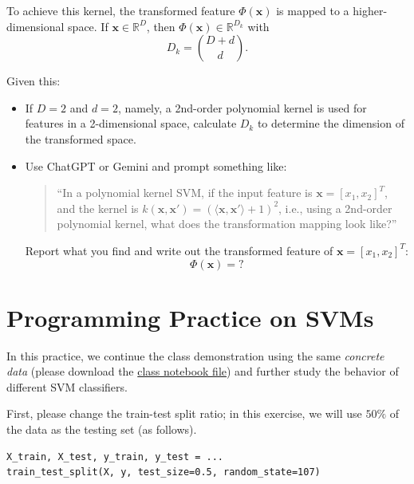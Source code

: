 \documentclass[12pt]{article}
\begin{document}
To achieve this kernel, the transformed feature $\Phi(\bm{x})$ is mapped to a higher-dimensional space. If $\bm{x} \in \mathbb{R}^D$, then $\Phi(\bm{x}) \in \mathbb{R}^{D_k}$ with 
\[
D_k = \binom{D+d}{d}.
\]

Given this:
\begin{itemize}
    \item If $D = 2$ and $d = 2$, namely, a 2nd-order polynomial kernel is used for features in a 2-dimensional space, calculate $D_k$ to determine the dimension of the transformed space.
    
    \item Use ChatGPT or Gemini and prompt something like: 
    \begin{quote}
    ``In a polynomial kernel SVM, if the input feature is $\bm{x} = [x_1, x_2]^T$, and the kernel is $k(\bm{x}, \bm{x}') = (\langle \bm{x}, \bm{x}'\rangle + 1)^2$, i.e., using a 2nd-order polynomial kernel, what does the transformation mapping look like?''
    \end{quote}
    Report what you find and write out the transformed feature of $\bm{x} = [x_1, x_2]^T$:
    \[
    \Phi(\bm{x}) = ?
    \]
    
\end{itemize}

\newpage
\section*{Programming Practice on SVMs}

In this practice, we continue the class demonstration using the same \emph{concrete data} (please download the \href{https://umsystem.instructure.com/courses/280496/files/33240224?module_item_id=9853160}{class notebook file}) and further study the behavior of different SVM classifiers.

First, please change the train-test split ratio; in this exercise, we will use $50\%$ of the data as the testing set (as follows).
\begin{verbatim}
X_train, X_test, y_train, y_test = ...
train_test_split(X, y, test_size=0.5, random_state=107)
\end{verbatim}
\end{document}
